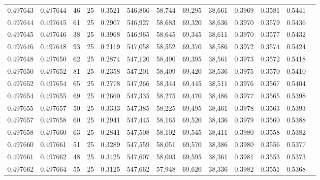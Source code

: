 \begin{tabular}{rrrrrrrrrrrrr}
0.497643 & 0.497644 &    46 &  25 &                                     0.3521 & 546,866 &  58,744 &  69,295 &  38,661 & 0.3969 & 0.3581 & 0.5441 \\
0.497644 & 0.497645 &    61 &  25 &                                     0.2907 & 546,927 &  58,683 &  69,320 &  38,636 & 0.3970 & 0.3579 & 0.5436 \\
0.497645 & 0.497646 &    38 &  25 &                                     0.3968 & 546,965 &  58,645 &  69,345 &  38,611 & 0.3970 & 0.3577 & 0.5432 \\
0.497646 & 0.497648 &    93 &  25 &                                     0.2119 & 547,058 &  58,552 &  69,370 &  38,586 & 0.3972 & 0.3574 & 0.5424 \\
0.497648 & 0.497650 &    62 &  25 &                                     0.2874 & 547,120 &  58,490 &  69,395 &  38,561 & 0.3973 & 0.3572 & 0.5418 \\
0.497650 & 0.497652 &    81 &  25 &                                     0.2358 & 547,201 &  58,409 &  69,420 &  38,536 & 0.3975 & 0.3570 & 0.5410 \\
0.497652 & 0.497654 &    65 &  25 &                                     0.2778 & 547,266 &  58,344 &  69,445 &  38,511 & 0.3976 & 0.3567 & 0.5404 \\
0.497654 & 0.497655 &    69 &  25 &                                     0.2660 & 547,335 &  58,275 &  69,470 &  38,486 & 0.3977 & 0.3565 & 0.5398 \\
0.497655 & 0.497657 &    50 &  25 &                                     0.3333 & 547,385 &  58,225 &  69,495 &  38,461 & 0.3978 & 0.3563 & 0.5393 \\
0.497657 & 0.497658 &    60 &  25 &                                     0.2941 & 547,445 &  58,165 &  69,520 &  38,436 & 0.3979 & 0.3560 & 0.5388 \\
0.497658 & 0.497660 &    63 &  25 &                                     0.2841 & 547,508 &  58,102 &  69,545 &  38,411 & 0.3980 & 0.3558 & 0.5382 \\
0.497660 & 0.497661 &    51 &  25 &                                     0.3289 & 547,559 &  58,051 &  69,570 &  38,386 & 0.3980 & 0.3556 & 0.5377 \\
0.497661 & 0.497662 &    48 &  25 &                                     0.3425 & 547,607 &  58,003 &  69,595 &  38,361 & 0.3981 & 0.3553 & 0.5373 \\
0.497662 & 0.497664 &    55 &  25 &                                     0.3125 & 547,662 &  57,948 &  69,620 &  38,336 & 0.3982 & 0.3551 & 0.5368 \\

\end{tabular}
